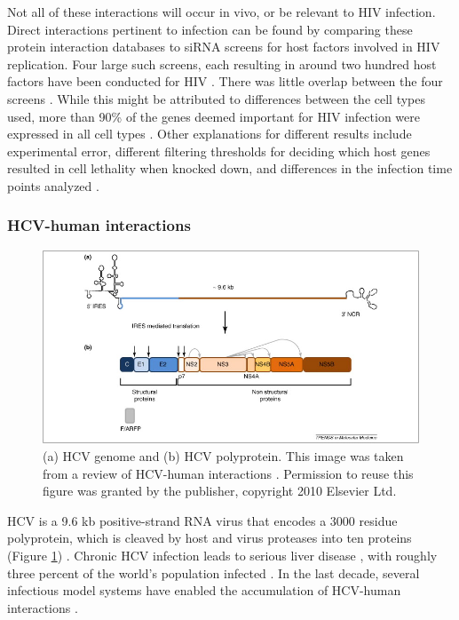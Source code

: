 Not all of these interactions will occur in vivo, or be relevant to
HIV infection. Direct interactions pertinent to infection can be found
by comparing these protein interaction databases to siRNA screens for
host factors involved in HIV replication. Four large such screens,
each resulting in around two hundred host factors have been conducted
for HIV \cite{zhou08, konig08, brass08, yeung09}. There was little
overlap between the four screens \cite{yeung09, bushman09}. While this
might be attributed to differences between the cell types used, more
than 90\% of the genes deemed important for HIV infection were
expressed in all cell types \cite{bushman09}. Other explanations for
different results include experimental error, different filtering
thresholds for deciding which host genes resulted in cell lethality
when knocked down, and differences in the infection time points
analyzed \cite{bushman09}.


\subsubsection{HCV-human interactions}

\begin{figure}
\begin{center}
\includegraphics[scale=0.75]{figs/hcv_proteins}
\end{center}
\caption[HCV genome]{\small (a) HCV genome and (b) HCV
  polyprotein. This image was taken from a review of HCV-human
  interactions \cite{georgel2010virus}. Permission to reuse this
  figure was granted by the publisher, copyright 2010 Elsevier
  Ltd. \label{fig:hcv_proteins}}
\end{figure}

HCV is a 9.6 kb positive-strand RNA virus that encodes a 3000 residue
polyprotein, which is cleaved by host and virus proteases into ten
proteins (Figure \ref{fig:hcv_proteins})
\cite{moradpour2007replication}. Chronic HCV infection leads to
serious liver disease \cite{georgel2010virus}, with roughly three
percent of the world's population infected
\cite{shepard2005global}. In the last decade, several infectious model
systems have enabled the accumulation of HCV-human interactions
\cite{georgel2010virus}.

